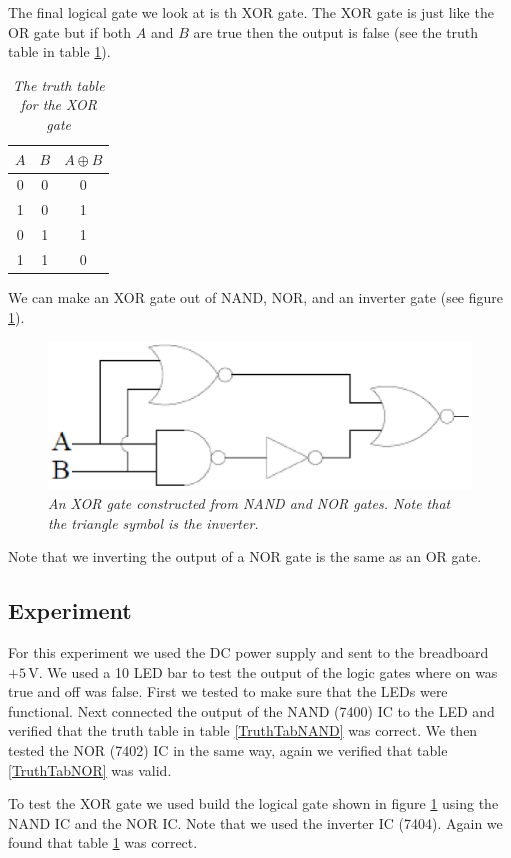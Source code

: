 \documentclass[11pt]{article}
\numberwithin{equation}{section}
\numberwithin{figure}{section}
\numberwithin{table}{section}
\newcommand{\unit}[1]{\ensuremath{\, \mathrm{#1}}}
\begin{document}
The final logical gate we look at is th XOR gate. The XOR gate is just like the OR gate but if both $A$ and $B$ are true then the output is false (see the truth table in table \ref{TruthTabXOR}).
\begin{table}[h]
\centering
\begin{tabular}{cc|c}
$A$	&$B$	&$A\oplus B$\\
\hline
0	&0	&0\\
1	&0	&1\\
0	&1	&1\\
1	&1	&0\\
\end{tabular}
\caption{\textit{The truth table for the XOR gate}}
\label{TruthTabXOR}
\end{table}
We can make an XOR gate out of NAND, NOR, and an inverter gate (see figure \ref{FigXOR}).
\begin{figure}[h]
\centering
\includegraphics[scale=0.60]{FigXOR.eps}
\caption{\textit{An XOR gate constructed from NAND and NOR gates. Note that the triangle symbol is the inverter.}}
\label{FigXOR}
\end{figure}
Note that we inverting the output of a NOR gate is the same as an OR gate. 

\subsection{Experiment}
For this experiment we used the DC power supply and sent to the breadboard $+5\unit{V}$. We used a 10 LED bar to test the output of the logic gates where on was true and off was false. First we tested to make sure that the LEDs were functional. Next connected the output of the NAND (7400) IC to the LED and verified that the truth table in table \ref{TruthTabNAND} was correct. We then tested the NOR (7402) IC in the same way, again we verified that table \ref{TruthTabNOR} was valid. 

To test the XOR gate we used build the logical gate shown in figure \ref{FigXOR} using the NAND IC and the NOR IC. Note that we used the inverter IC (7404). Again we found that table \ref{TruthTabXOR} was correct. 
\end{document}
